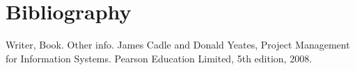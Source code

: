 \section*{Bibliography}

\begin{thebibliography}{9}
Writer,
Book. Other info.
James Cadle and Donald Yeates,
Project Management
for Information Systems. Pearson Education Limited, 5th edition, 2008.
\end{thebibliography}
\newpage